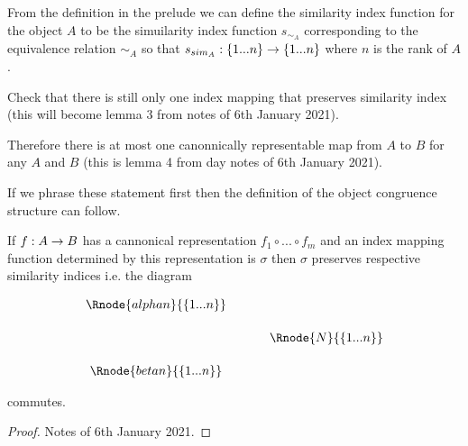 \documentclass[10pt,a4paper]{scrartcl}
\begin{document}
From the definition in the prelude we can define the similarity index function for the object $A$
to be the simuilarity index function $s_{\sim_A}$ corresponding to the equivalence relation 
$\sim_A$ so that $s_{sim_A}: \left\{1...n\right\} \rightarrow \left\{1...n\right\}$ where $n$ is the rank of $A$.
\begin{notebox}
Check that there is still only one index mapping that preserves similarity index
(this will become lemma 3 from notes of 6th January 2021).

Therefore
there is at most one canonnically representable map from $A$ to $B$ for any $A$ and $B$
(this is lemma 4 from day notes of 6th January 2021).

If we phrase these statement first then the definition of the object congruence structure can follow.
\end{notebox}

\begin{lemma}
If $f: A \rightarrow B$ has a cannonical representation $f_1 \circ ...\circ f_m$ and an index mapping function determined by this representation is $\sigma$ then $\sigma$ preserves 
respective similarity indices i.e. the diagram

\begin{center}
\begin{equation}
\label{preservingcopynumber}
\begin{array}{cp{.5cm}c}
\Rnode{alphan}{\set{\n}}  &&              \\ [0.5cm]
												  && \Rnode{N}{\set{\n}} \\ [0.5cm]
\Rnode{betan}{\set{\n}}   &&            
\end{array}
\end{equation}
\blabel{\sigma}
\end{center}
commutes.
\end{lemma}
\begin{proof}
Notes of 6th January 2021.
\end{proof}
\end{document}
